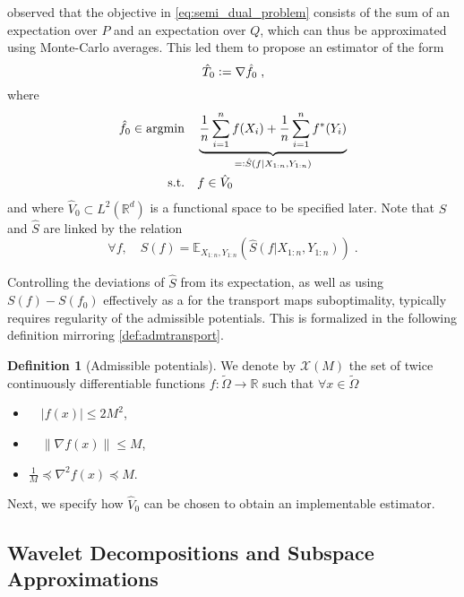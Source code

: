 \documentclass{article}
\theoremstyle{plain}
\theoremstyle{definition}
\newtheorem{definition}[theorem]{Definition}
\theoremstyle{remark}
\newcommand{\R}[0]{\mathbb{R}}
\newcommand{\E}[0]{\mathbb{E}}
\newcommand{\argmin}[0]{\operatorname{argmin}}
\newcommand{\eqdef}{\vcentcolon=}
\newcommand{\defeq}{=\vcentcolon}
\newcommand\p[1]{\left( {#1}\right)}
\begin{document}
\citet{hutter2021minimax} observed that the objective in \eqref{eq:semi_dual_problem} consists of the sum of an expectation over $P$ and an expectation over $Q$, which can thus be approximated using Monte-Carlo averages.
This led them to propose an estimator of the form 
\begin{equation}
    \hat{T}_0 \eqdef \nabla \hat{f}_0 \;,
\end{equation}
where
\begin{equation}
    \label{empiricalsemidualproblem}
    \begin{aligned}
\hat{f}_0 \in \argmin \quad & \underbrace{ \frac{1}{n} \sum_{i = 1}^n f(X_i) + \frac{1}{n} \sum_{i = 1}^n f^*(Y_i)}_{\defeq \hat{S}(f | X_{1:n}, Y_{1:n})}\\
\textrm{s.t.} \quad & f \in \hat{V}_0
\end{aligned}
\end{equation}
and where $\hat{V}_0 \subset L^2(\R^d)$ is a functional space to be specified later.
Note that $S$ and $\hat{S}$ are linked by the relation 
\begin{equation}
    \forall f, \quad S(f) = \E_{X_{1:n}, Y_{1:n}} \p{\hat{S}(f | X_{1:n}, Y_{1:n})} \;.
\end{equation}

Controlling the deviations of $\hat{S}$ from its expectation, as well as using $S(f) - S(f_0)$ effectively as a  for the transport maps suboptimality, typically requires regularity of the admissible potentials. This is formalized in the following definition mirroring \cref{def:admtransport}.

\begin{definition}[Admissible potentials]
    We denote by $\mathcal{X}(M)$ the set of twice continuously differentiable functions $f: \tilde{\Omega} \rightarrow \R$ such that $\forall x \in \tilde{\Omega} $
    \begin{itemize}
        \item $\quad |f(x)| \leq 2M^2$,
        \item $ \quad \| \nabla f(x) \| \leq M$,
        \item $\frac{1}{M} \preceq \nabla^2 f (x) \preceq M$.
    \end{itemize}
\end{definition}

Next, we specify how $\hat{V}_0$ can be chosen to obtain an implementable estimator.


\subsection{Wavelet Decompositions and Subspace Approximations}\label{sec:empricalestimator}
\end{document}
